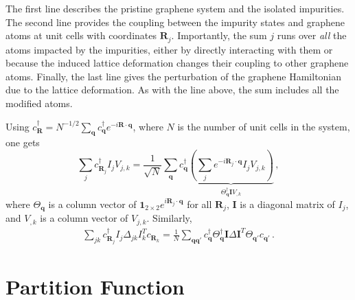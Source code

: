 \documentclass[aps,prb,superscriptaddress,preprint,floatfix]{revtex4-1}
\begin{document}
The first line describes the pristine graphene system and the isolated impurities. The second line provides the coupling between the impurity states and graphene atoms at unit cells with coordinates $\mathbf{R}_j$. Importantly, the sum $j$ runs over \emph{all} the atoms impacted by the impurities, either by directly interacting with them or because the induced lattice deformation changes their coupling to other graphene atoms. Finally, the last line gives the perturbation of the graphene Hamiltonian due to the lattice deformation. As with the line above, the sum includes all the modified atoms.

Using  $c^\dagger_\mathbf{R} = N^{-1/2}\sum_\mathbf{q}c^\dagger_\mathbf{q} e^{-i\mathbf{R}\cdot\mathbf{q}}$, where $N$ is the number of unit cells in the system, one gets
%
\begin{equation}
    \sum_{j}
    c^\dagger_{\mathbf{R}_j} I_j V_{j,k}
    = 
    \frac{1}{\sqrt{N}}
    \sum_\mathbf{q}c^\dagger_{\mathbf{q}}
    \underbrace{\left(\sum_{j}e^{-i\mathbf{R}_j\cdot\mathbf{q}} I_j V_{j,k}\right)}_{\Theta_\mathbf{q}^\dagger \mathbf{I} V_{,k}}\,,
    \label{eqn:Coupling}
\end{equation}
%
where $\Theta_\mathbf{q}$ is a column vector of $\mathbf{1}_{2\times 2} e^{i\mathbf{R}_j\cdot\mathbf{q}}$ for all $\mathbf{R}_j$, $\mathbf{I}$ is a diagonal matrix of $I_j$, and $V_{,k}$ is a column vector of $V_{j,k}$. Similarly,
%
\begin{align}
	\sum_{jk} c_{\mathbf{R}_j}^\dagger I_j \Delta_{jk} I^T_kc_{\mathbf{R}_k}
	=\frac{1}{N}\sum_{\mathbf{qq}'} c_{\mathbf{q}}^\dagger \Theta_{\mathbf{q}}^\dagger\mathbf{I}\Delta \mathbf{I}^T\Theta_{\mathbf{q}'}c_{\mathbf{q}'}\,.
	\label{eqn:Delta}
\end{align}
%

\section{Partition Function}
\end{document}
